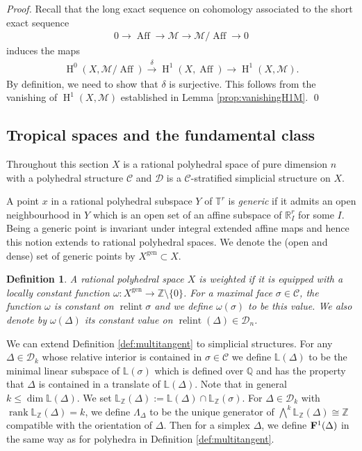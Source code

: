 \documentclass[11pt]{article}
\numberwithin{equation}{numsection}
\newcommand{\Z}{{\mathbb Z}}
\newcommand{\CC}{{\mathcal C}}
\newcommand{\R}{{\mathbb R}}
\newcommand{\QQ}{{\mathbb Q}}
\newcommand{\T}{{\mathbb T}}
\newcommand{\MS}{\mathcal{M}}
\newcommand{\Linear}{\mathbb{L}}
\newcommand{\DD}{\mathcal{D}}
\newcommand{\BF}{{\bf F}}
\DeclareMathOperator{\Aff}{Aff}
\DeclareMathOperator{\relint}{relint}
\DeclareMathOperator{\gen}{gen}
\DeclareMathOperator{\rank}{rank}
\DeclareMathOperator{\HH}{H}
\newtheorem{defn}[thm]{Definition}
\begin{document}
\begin{proof}
  Recall that the long exact sequence on cohomology associated to 
	the short exact sequence
	\begin{align*}
		0 \to \Aff \to \MS \to \MS / \Aff \to 0
	\end{align*}
	induces the maps
	\begin{align*} 
		\HH^{0}(X, \MS / \Aff) \stackrel{\delta}{\rightarrow} \HH^1(X, \Aff) \rightarrow \HH^1(X, \MS).
	\end{align*}
	By definition, we need to show that $\delta$ is surjective. 
	This follows from the vanishing of $\HH^1(X, \MS)$ established in Lemma
	\ref{prop:vanishingH1M}.
	\qed
\end{proof}




\subsection{Tropical spaces and the fundamental class}

Throughout this section $X$ is a rational polyhedral space of pure dimension $n$ with a polyhedral structure $\CC$ and 
$\DD$ is a $\CC$-stratified simplicial structure on $X$.


A point $x$ in a rational polyhedral subspace $Y$ of $\T^r$  is \emph{generic} if it 
admits an open neighbourhood in $Y$ which is an open set of an affine subspace of $\R^r_I$ for some $I$.
Being a  generic point is invariant under integral extended affine maps and hence this notion 
extends to rational polyhedral spaces.  
We denote the (open and dense) set of generic points by $X^{\gen} \subset X$. 


\begin{defn}\label{def:weighted}
A rational polyhedral space  $X$ is \emph{weighted} if it is equipped with a locally constant function 
$\omega \colon X^{\gen} \to \Z\setminus \{0\}$. 
For a maximal face $\sigma \in \CC$, the function $\omega$ is constant on $\relint \sigma$ and 
we define $\omega(\sigma)$ to be this value. 
We also denote by $\omega(\Delta)$ its constant value on $\relint(\Delta) \in \DD_n$.
\end{defn}


We can extend Definition \ref{def:multitangent} to simplicial structures. For any $\Delta \in \DD_k$ whose relative interior is contained in $\sigma \in \CC$
we define  $\Linear(\Delta)$
to be the minimal 
linear subspace
 of $ \Linear(\sigma)$ which is defined over $\QQ$ and 
has the property that $\Delta$ is contained in a translate of $\Linear(\Delta)$.
Note that in general $k \leq \dim \Linear(\Delta)$. 
We set $\Linear_{\Z}(\Delta) := \Linear(\Delta) \cap \Linear_\Z(\sigma)$.
For $\Delta \in \DD_k$ with $\rank \Linear_{\Z}(\Delta) = k$, we 
define $\Lambda_\Delta$ to be the unique generator of 
$\bigwedge^k \Linear_{\Z}(\Delta) \cong \Z$ 
 compatible with the orientation of $\Delta$.
Then for a simplex $\Delta$, we define $\BF^1(\Delta)$ in the same way as for polyhedra in Definition \ref{def:multitangent}. 
\end{document}
